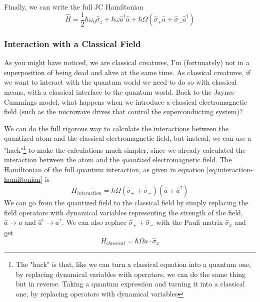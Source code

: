\par

Finally, we can write the full JC Hamiltonian
\begin{equation} \label{eq:JC-hamiltonian}
    \boxed{\hat{H} = \frac{1}{2}\hbar \omega_0\hat{\sigma}_z 
                     + \hbar \omega \hat{a}^\dag \hat{a} 
                     +  \hbar\Omega (\hat{\sigma}_+\hat{a} + \hat{\sigma}_-\hat{a}^\dag)}
\end{equation}


\subsubsection{Interaction with a Classical Field} \label{sec:interaction-with_classical-field}
As you might have noticed, we are classical creatures, I'm (fortunately) not in a superposition of being dead and alive at the same time. As classical creatures, if we want to interact with the quantum world we need to do so with classical means, with a classical interface to the quantum world. Back to the Jaynes-Cummings model, what happens when we introduce a classical electromagnetic field (such as the microwave drives that control the superconducting system)?

We can do the full rigorous way to calculate the interactions between the quantized atom and the classical electromagnetic field, but instead, we can use a "hack"\footnote{The "hack" is that, like we can turn a classical equation into a quantum one, by replacing dynamical variables with operators, we can do the same thing but in reverse. Taking a quantum expression and turning it into a classical one, by replacing operators with dynamical variables} to make the calculations much simpler, since we already calculated the interaction between the atom and the \textit{quantized} electromagnetic field. The Hamiltonian of the full quantum interaction, as given in equation \ref{eq:interaction-hamiltonian} is
\[
    H_{interaction} = \hbar \Omega (\hat{\sigma}_+ + \hat{\sigma}_-) (\hat{a} + \hat{a}^\dag)
\]
We can go from the quantized field to the classical field by simply replacing the field operators with dynamical variables representing the strength of the field, $\hat{a} \rightarrow a$ and $\hat{a}^\dag \rightarrow a^*$. We can also replace $\hat{\sigma}_+ + \hat{\sigma}_-$ with the Pauli matrix $\hat{\sigma}_x$ and get
\begin{equation}\label{eq:atom-field-class-int}
    H_{classical} = \hbar \Omega a \cdot \hat{\sigma}_x
\end{equation}


